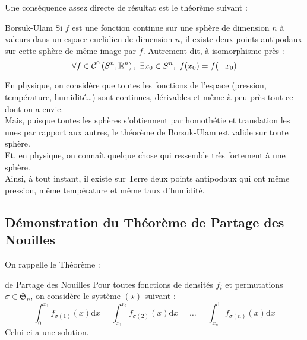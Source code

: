 \documentclass{cours}
\begin{document}
Une conséquence assez directe de résultat est le théorème suivant :
\begin{théorème}{Borsuk-Ulam}{}
Si $f$ est une fonction continue sur une sphère de dimension $n$ à valeurs dans un espace euclidien de dimension $n$, il existe deux points antipodaux sur cette sphère de même image par $f$. Autrement dit, à isomorphisme près :
\[
    \forall f \in \mathcal{C}^{0}\left(S^{n}, \mathbb{R}^{n}\right), \ \exists x_{0} \in S^{n}, \ f(x_{0}) = f(-x_{0})
\]
\end{théorème}

\begin{remarque}{}{}
    En physique, on considère que toutes les fonctions de l'espace (pression, température, humidité\dots) sont continues, dérivables et même à peu près tout ce dont on a envie.\\
    Mais, puisque toutes les sphères s'obtiennent par homothétie et translation les unes par rapport aux autres, le théorème de Borsuk-Ulam est valide sur toute sphère.\\
    Et, en physique, on connaît quelque chose qui ressemble très fortement à une sphère.\\
    Ainsi, à tout instant, il existe sur Terre deux points antipodaux qui ont même pression, même température et même taux d'humidité.
\end{remarque}

\subsection{Démonstration du Théorème de Partage des Nouilles}
On rappelle le Théorème :
\begin{théorème}{de Partage des Nouilles}{}
Pour toutes fonctions de densités $f_{i}$ et permutations $\sigma \in \mathfrak{S}_{n}$, on considère le système $(\star)$ suivant :
\begin{equation*}\tag{$\star$}
    \int_{0}^{x_{1}}f_{\sigma(1)}(x) \mathrm{d}x = \int_{x_{1}}^{x_{2}}f_{\sigma(2)}(x)\mathrm{d}x = \ldots = \int_{x_{n}}^{1}f_{\sigma(n)}(x) \mathrm{d}x
\end{equation*}
Celui-ci a une solution.
\end{théorème}
\end{document}
